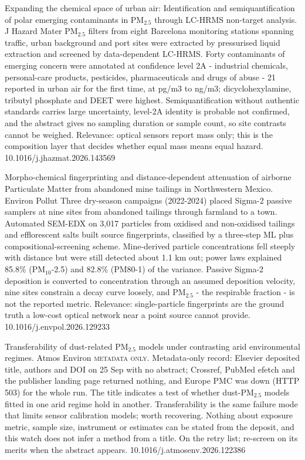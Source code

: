 \documentclass[10pt]{article}
\begin{document}
{Expanding the chemical space of urban air: Identification and semiquantification of polar emerging contaminants in PM$_{2.5}$ through LC-HRMS non-target analysis.}
{J Hazard Mater}
{PM$_{2.5}$ filters from eight Barcelona monitoring stations spanning traffic, urban background and port sites were extracted by pressurised liquid extraction and screened by data-dependent LC-HRMS. Forty contaminants of emerging concern were annotated at confidence level 2A - industrial chemicals, personal-care products, pesticides, pharmaceuticals and drugs of abuse - 21 reported in urban air for the first time, at pg/m3 to ng/m3; dicyclohexylamine, tributyl phosphate and DEET were highest. Semiquantification without authentic standards carries large uncertainty, level-2A identity is probable not confirmed, and the abstract gives no sampling duration or sample count, so site contrasts cannot be weighed. Relevance: optical sensors report mass only; this is the composition layer that decides whether equal mass means equal hazard.}
{10.1016/j.jhazmat.2026.143569}

{Morpho-chemical fingerprinting and distance-dependent attenuation of airborne Particulate Matter from abandoned mine tailings in Northwestern Mexico.}
{Environ Pollut}
{Three dry-season campaigns (2022-2024) placed Sigma-2 passive samplers at nine sites from abandoned tailings through farmland to a town. Automated SEM-EDX on 3,017 particles from oxidised and non-oxidised tailings and efflorescent salts built source fingerprints, classified by a three-step ML plus compositional-screening scheme. Mine-derived particle concentrations fell steeply with distance but were still detected about 1.1 km out; power laws explained 85.8\% (PM$_{10}$-2.5) and 82.8\% (PM80-1) of the variance. Passive Sigma-2 deposition is converted to concentration through an assumed deposition velocity, nine sites constrain a decay curve loosely, and PM$_{2.5}$ - the respirable fraction - is not the reported metric. Relevance: single-particle fingerprints are the ground truth a low-cost optical network near a point source cannot provide.}
{10.1016/j.envpol.2026.129233}

{Transferability of dust-related PM$_{2.5}$ models under contrasting arid environmental regimes.}
{Atmos Environ}
{\textsc{metadata only.} Metadata-only record: Elsevier deposited title, authors and DOI on 25 Sep with no abstract; Crossref, PubMed efetch and the publisher landing page returned nothing, and Europe PMC was down (HTTP 503) for the whole run. The title indicates a test of whether dust-PM$_{2.5}$ models fitted in one arid regime hold in another. Transferability is the same failure mode that limits sensor calibration models; worth recovering. Nothing about exposure metric, sample size, instrument or estimates can be stated from the deposit, and this watch does not infer a method from a title. On the retry list; re-screen on its merits when the abstract appears.}
{10.1016/j.atmosenv.2026.122386}
\end{document}
